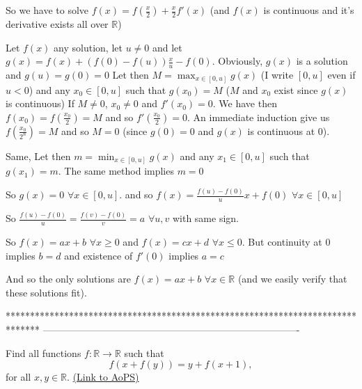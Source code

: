 \begin{solution}
	So we have to solve $ f(x) = f(\frac x2) + \frac x2f'(x)$ (and $ f(x)$ is continuous and it's derivative exists all over $ \mathbb R$)

Let $ f(x)$ any solution, let $ u\neq 0$ and let $ g(x) = f(x) + (f(0) - f(u))\frac xu - f(0)$. Obviously, $ g(x)$ is a solution and $ g(u) = g(0) = 0$
Let then $ M = \max_{x\in[0,u]}g(x)$ (I write $ [0,u]$ even if $ u < 0$) and any $ x_0\in[0,u]$ such that $ g(x_0) = M$ ($ M$ and $ x_0$ exist since $ g(x)$ is continuous)
If $ M\neq 0$, $ x_0\neq 0$ and $ f'(x_0) = 0$. We have then $ f(x_0) = f(\frac {x_0}{2}) = M$ and so $ f'(\frac {x_0}{2}) = 0$. 
An immediate induction give us $ f(\frac {x_0}{2^n}) = M$ and so $ M = 0$ (since $ g(0) = 0$ and $ g(x)$ is continuous at $ 0$).

Same, Let then $ m = \min_{x\in[0,u]}g(x)$ and any $ x_1\in[0,u]$ such that $ g(x_1) = m$. The same method implies $ m = 0$

So $ g(x) = 0$ $ \forall x\in[0,u]$. and so $ f(x) = \frac {f(u) - f(0)}{u}x + f(0)$ $ \forall x\in[0,u]$

So  $ \frac {f(u) - f(0)}{u} = \frac {f(v) - f(0)}{v}=a$ $ \forall u,v$ with same sign.

So $ f(x) = ax + b$ $ \forall x\geq 0$ and $ f(x) = cx + d$ $ \forall x\leq 0$. But continuity at $ 0$ implies $ b = d$ and existence of $ f'(0)$ implies $ a = c$

And so the only solutions are $ f(x) = ax + b$ $ \forall x\in\mathbb R$ (and we easily verify that these solutions fit).
\end{solution}
*******************************************************************************
-------------------------------------------------------------------------------

\begin{problem}
	Find all functions $f: \mathbb R \to \mathbb R$ such that
\[ f(x+f(y))=y+f(x+1),\] 
for all $x,y \in \mathbb R$.
	\flushright \href{https://artofproblemsolving.com/community/c6h278402}{(Link to AoPS)}
\end{problem}



